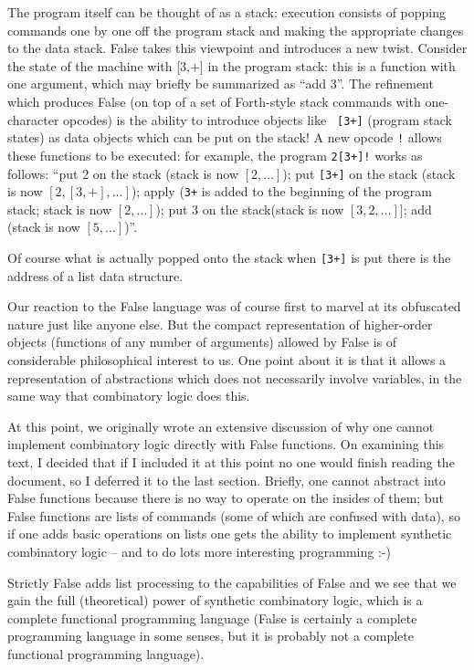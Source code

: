 \documentclass[12pt]{article}
\begin{document}
The program itself can be thought of as a stack: execution consists of
popping commands one by one off the program stack and making the
appropriate changes to the data stack.  False takes this viewpoint and
introduces a new twist.  Consider the state of the machine with [3,+]
in the program stack: this is a function with one argument, which may
briefly be summarized as ``add 3''.  The refinement which produces
False (on top of a set of Forth-style stack commands with
one-character opcodes) is the ability to introduce objects like {\tt
[3+]} (program stack states) as data objects which can be put on the
stack!  A new opcode {\tt !} allows these functions to be executed:
for example, the program {\tt 2[3+]!} works as follows: ``put 2 on the
stack (stack is now $[2,\ldots]$); put {\tt [3+]} on the stack (stack
is now $[2,[3,+],\ldots]$); apply ({\tt 3+} is added to the beginning of
the program stack; stack is now $[2,\ldots]$); put 3 on the
stack(stack is now $[3,2,\ldots]]$; add (stack is now $[5,\ldots]$)''.

Of course what is actually popped onto the stack when {\tt [3+]} is
put there is the address of a list data structure.

Our reaction to the False language was of course first to marvel at
its obfuscated nature just like anyone else.  But the compact
representation of higher-order objects (functions of any number of
arguments) allowed by False is of considerable philosophical interest
to us.  One point about it is that it allows a representation of
abstractions which does not necessarily involve variables, in the same
way that combinatory logic does this.

At this point, we originally wrote an extensive discussion of why one
cannot implement combinatory logic directly with False functions.  On
examining this text, I decided that if I included it at this point no
one would finish reading the document, so I deferred it to the last
section.  Briefly, one cannot abstract into False functions because
there is no way to operate on the insides of them; but False functions
are lists of commands (some of which are confused with data), so if
one adds basic operations on lists one gets the ability to
implement synthetic combinatory logic -- and to do lots more
interesting programming :-)

Strictly False adds list processing to the capabilities of False and
we see that we gain the full (theoretical) power of synthetic
combinatory logic, which is a complete functional programming language
(False is certainly a complete programming language in some senses,
but it is probably not a complete functional programming language).
\end{document}
